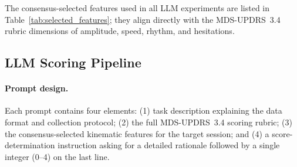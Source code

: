 \documentclass[conference]{IEEEtran}
\begin{document}
The consensus-selected features used in all LLM experiments are listed in
Table~\ref{tab:selected_features}; they align directly with the MDS-UPDRS~3.4 rubric
dimensions of amplitude, speed, rhythm, and hesitations.

\begin{table}[htbp]
    \centering
    \caption{Consensus-Selected Features (top-$N^{*}$=7 by $\hat{\Pi}_j$, 12 qualifying methods)}
    \label{tab:selected_features}
    \renewcommand{\arraystretch}{1.2}
\end{table}

\subsection{LLM Scoring Pipeline}

\paragraph{Prompt design.}
Each prompt contains four elements: (1) task description explaining the data format
and collection protocol; (2) the full MDS-UPDRS~3.4 scoring rubric; (3) the
consensus-selected kinematic features for the target session; and (4) a
score-determination instruction asking for a detailed rationale followed by a single
integer (0--4) on the last line.
\end{document}
